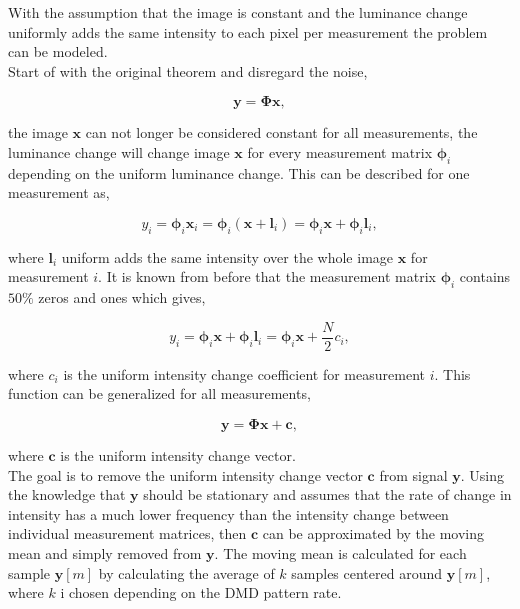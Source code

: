 With the assumption that the image is constant and the luminance change uniformly adds the same intensity to each pixel per measurement the problem can be modeled.\\[0.1in]

Start of with the original theorem and disregard the noise, 

\begin{equation}
\mathbf{y} = \mathbf{\Phi}\mathbf{x},
\end{equation}  

the image $\mathbf{x}$ can not longer be considered constant for all measurements, the luminance change will change image $\mathbf{x}$ for every measurement matrix $\mathbf{\phi}_i$ depending on the uniform luminance change. This can be described for one measurement as,  

\begin{equation}
y_i = \mathbf{\phi}_i\mathbf{x}_i = \mathbf{\phi}_i(\mathbf{x} + \mathbf{l}_i) = \mathbf{\phi}_i\mathbf{x} + \mathbf{\phi}_i\mathbf{l}_i ,
\end{equation}
  
where $\mathbf{l}_i$ uniform adds the same intensity over the whole image $\mathbf{x}$ for measurement $i$. It is known from before that the measurement matrix $\mathbf{\phi}_i$ contains $50\%$ zeros and ones which gives,

\begin{equation}
y_i = \mathbf{\phi}_i\mathbf{x} + \mathbf{\phi}_i\mathbf{l}_i = \mathbf{\phi}_i\mathbf{x} + \frac{N}{2}c_i,
\end{equation}

where $c_i$ is the uniform intensity change coefficient for measurement $i$. This function can be generalized for all measurements,

\begin{equation}
\mathbf{y} =  \mathbf{\Phi}\mathbf{x} + \mathbf{c},
\end{equation}

where $\mathbf{c}$ is the uniform intensity change vector.\\[0.1in]

The goal is to remove the uniform intensity change vector $\mathbf{c}$ from signal $\mathbf{y}$. Using the knowledge that $\mathbf{y}$ should be stationary and assumes that the rate of change in intensity has a much lower frequency than the intensity change between individual measurement matrices, then $\mathbf{c}$ can be approximated by the moving mean and simply removed from $\mathbf{y}$. The moving mean is calculated for each sample $\mathbf{y}[m]$ by calculating the average of $k$ samples centered around $\mathbf{y}[m]$, where $k$ i chosen depending on the DMD pattern rate.\\[0.1in]

